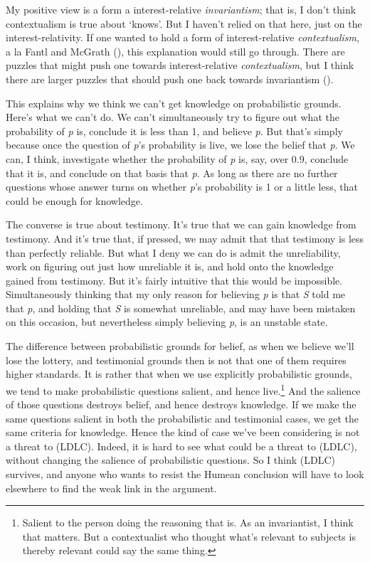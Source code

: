 \documentclass[
  11pt,
  letterpaper,
  DIV=11,
  numbers=noendperiod,
  twoside]{scrartcl}
\begin{document}
My positive view is a form a interest-relative \emph{invariantism}; that
is, I don't think contextualism is true about `knows'. But I haven't
relied on that here, just on the interest-relativity. If one wanted to
hold a form of interest-relative \emph{contextualism}, a la Fantl and
McGrath (), this explanation would
still go through. There are puzzles that might push one towards
interest-relative \emph{contextualism}, but I think there are larger
puzzles that should push one back towards invariantism
().

This explains why we think we can't get knowledge on probabilistic
grounds. Here's what we can't do. We can't simultaneously try to figure
out what the probability of \emph{p} is, conclude it is less than 1, and
believe \emph{p}. But that's simply because once the question of
\emph{p}'s probability is live, we lose the belief that \emph{p}. We
can, I think, investigate whether the probability of \emph{p} is, say,
over 0.9, conclude that it is, and conclude on that basis that \emph{p}.
As long as there are no further questions whose answer turns on whether
\emph{p}'s probability is 1 or a little less, that could be enough for
knowledge.

The converse is true about testimony. It's true that we can gain
knowledge from testimony. And it's true that, if pressed, we may admit
that that testimony is less than perfectly reliable. But what I deny we
can do is admit the unreliability, work on figuring out just how
unreliable it is, and hold onto the knowledge gained from testimony. But
it's fairly intuitive that this would be impossible. Simultaneously
thinking that my only reason for believing \emph{p} is that \emph{S}
told me that \emph{p}, and holding that \emph{S} is somewhat unreliable,
and may have been mistaken on this occasion, but nevertheless simply
believing \emph{p}, is an unstable state.

The difference between probabilistic grounds for belief, as when we
believe we'll lose the lottery, and testimonial grounds then is not that
one of them requires higher standards. It is rather that when we use
explicitly probabilistic grounds, we tend to make probabilistic
questions salient, and hence live.\footnote{Salient to the person doing
  the reasoning that is. As an invariantist, I think that matters. But a
  contextualist who thought what's relevant to subjects is thereby
  relevant could say the same thing.} And the salience of those
questions destroys belief, and hence destroys knowledge. If we make the
same questions salient in both the probabilistic and testimonial cases,
we get the same criteria for knowledge. Hence the kind of case we've
been considering is not a threat to (LDLC). Indeed, it is hard to see
what could be a threat to (LDLC), without changing the salience of
probabilistic questions. So I think (LDLC) survives, and anyone who
wants to resist the Humean conclusion will have to look elsewhere to
find the weak link in the argument.
\end{document}
